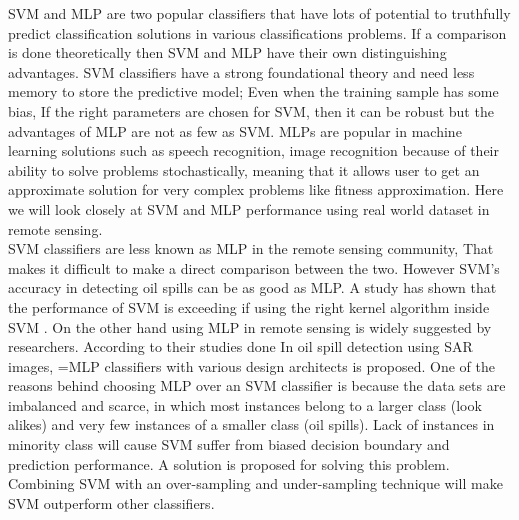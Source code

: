 SVM and MLP are two popular classifiers that have lots of potential to truthfully predict classification solutions in various classifications problems\cite{Moavenian20103088,Zanaty2012177}. 
If a comparison is done theoretically then SVM and MLP have their own distinguishing advantages. 
SVM classifiers have a strong foundational theory and need less memory to store the predictive model; Even when the training sample has some bias, If the right parameters are chosen for SVM, then it can be robust\cite{auria2008support} 
but the advantages of MLP are not as few as SVM. 
MLPs are popular in machine learning solutions such as speech recognition, image recognition because of their ability to solve problems stochastically, meaning that it allows user to get an approximate solution for very complex problems like fitness approximation\cite{jin2005neural}. 
Here we will look closely at SVM and MLP performance using real world dataset in remote sensing.\\

SVM classifiers are less known as MLP in the remote sensing community, That makes it difficult to make a direct comparison between the two. 
However SVM's accuracy in detecting oil spills can be as good as MLP. A study has shown that the performance of SVM is exceeding if using the right kernel algorithm inside SVM \cite{liu2006boosting}. On the other hand using MLP in remote sensing is widely suggested by researchers\cite{Mera201472,Brekke200595,fingas2014review}. According to their studies done In oil spill detection using SAR images, =MLP classifiers with various design architects is proposed. 
One of the reasons behind choosing MLP over an SVM classifier is because the data sets are imbalanced and scarce, in which most instances belong to a larger class (look alikes) and very few instances of a smaller class (oil spills). Lack of instances in minority class will cause SVM suffer from biased decision boundary and prediction performance. A solution is proposed for solving this problem. Combining SVM with an over-sampling and under-sampling technique will make SVM outperform other classifiers\cite{liu2006boosting}.

